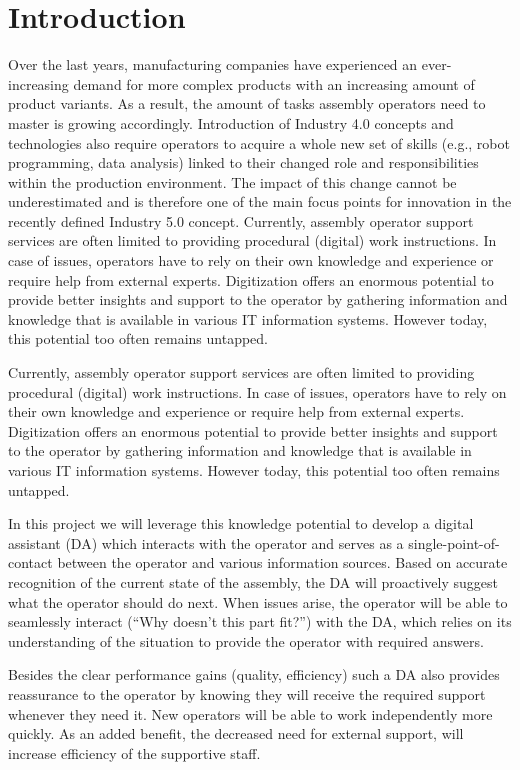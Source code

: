 \section{Introduction}\label{sec:Introduction}

Over the last years, manufacturing companies have experienced an ever-increasing demand for more complex products with an increasing amount of product variants. As a result, the amount of tasks assembly operators need to master is growing accordingly. Introduction of Industry 4.0 concepts and technologies also require operators to acquire a whole new set of skills (e.g., robot programming, data analysis) linked to their changed role and responsibilities within the production environment. The impact of this change cannot be underestimated and is therefore one of the main focus points for innovation in the recently defined Industry 5.0 concept. Currently, assembly operator support services are often limited to providing procedural (digital) work instructions. In case of issues, operators have to rely on their own knowledge and experience or require help from external experts. Digitization offers an enormous potential to provide better insights and support to the operator by gathering information and knowledge that is available in various IT information systems. However today, this potential too often remains untapped.

Currently, assembly operator support services are often limited to providing procedural (digital) work instructions. In case of issues, operators have to rely on their own knowledge and experience or require help from external experts. Digitization offers an enormous potential to provide better insights and support to the operator by gathering information and knowledge that is available in various IT information systems. However today, this potential too often remains untapped. 

In this project we will leverage this knowledge potential to develop a digital assistant (DA) which interacts with the operator and serves as a single-point-of-contact between the operator and various information sources. Based on accurate recognition of the current state of the assembly, the DA will proactively suggest what the operator should do next. When issues arise, the operator will be able to seamlessly interact (“Why doesn’t this part fit?”) with the DA, which relies on its understanding of the situation to provide the operator with required answers. 

Besides the clear performance gains (quality, efficiency) such a DA also provides reassurance to the operator by knowing they will receive the required support whenever they need it. New operators will be able to work independently more quickly. As an added benefit, the decreased need for external support, will increase efficiency of the supportive staff.

